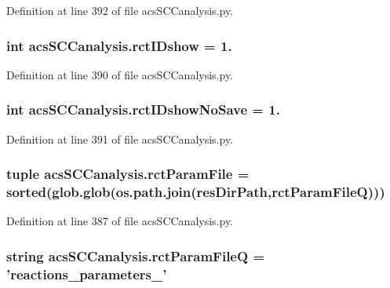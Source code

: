 Definition at line 392 of file acs\-S\-C\-Canalysis.\-py.

\hypertarget{a00128_a8a780c7762bc8a40f296abfd474b7ce4}{
\subsubsection[{rct\-I\-Dshow}]{\setlength{\rightskip}{0pt plus 5cm}int acs\-S\-C\-Canalysis.\-rct\-I\-Dshow = 1.}}\label{a00128_a8a780c7762bc8a40f296abfd474b7ce4}


Definition at line 390 of file acs\-S\-C\-Canalysis.\-py.

\hypertarget{a00128_a3942b0b71d5893c244f7f49929db336b}{
\subsubsection[{rct\-I\-Dshow\-No\-Save}]{\setlength{\rightskip}{0pt plus 5cm}int acs\-S\-C\-Canalysis.\-rct\-I\-Dshow\-No\-Save = 1.}}\label{a00128_a3942b0b71d5893c244f7f49929db336b}


Definition at line 391 of file acs\-S\-C\-Canalysis.\-py.

\hypertarget{a00128_ac700504fc38d7684ec9fae104d7d90a3}{
\subsubsection[{rct\-Param\-File}]{\setlength{\rightskip}{0pt plus 5cm}tuple acs\-S\-C\-Canalysis.\-rct\-Param\-File = sorted(glob.\-glob(os.\-path.\-join({\bf res\-Dir\-Path},{\bf rct\-Param\-File\-Q})))}}\label{a00128_ac700504fc38d7684ec9fae104d7d90a3}


Definition at line 387 of file acs\-S\-C\-Canalysis.\-py.

\hypertarget{a00128_aff5ea475bb2c78122a231a915dc88e89}{
\subsubsection[{rct\-Param\-File\-Q}]{\setlength{\rightskip}{0pt plus 5cm}string acs\-S\-C\-Canalysis.\-rct\-Param\-File\-Q = 'reactions\-\_\-parameters\-\_\-'}}\label{a00128_aff5ea475bb2c78122a231a915dc88e89}


